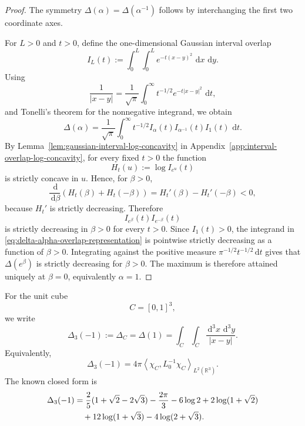 \documentclass[11pt]{article}
\newcommand{\R}{\mathbb{R}}
\newcommand{\dd}{\,\mathrm{d}}
\newcommand{\braket}[2]{\left\langle #1,#2\right\rangle}
\begin{document}
\begin{proof}
The symmetry \(\Delta(\alpha)=\Delta(\alpha^{-1})\) follows by interchanging
the first two coordinate axes.

For \(L>0\) and \(t>0\), define the one-dimensional Gaussian interval
overlap
\begin{equation}
    I_L(t):=\int_0^L\int_0^L e^{-t(x-y)^2}\,\dd x\,\dd y.
    \label{eq:interval-overlap-main}
\end{equation}
Using
\[
    \frac{1}{|x-y|}
    =
    \frac{1}{\sqrt\pi}
    \int_0^\infty t^{-1/2}e^{-t|x-y|^2}\,\dd t,
\]
and Tonelli's theorem for the nonnegative integrand, we obtain
\begin{equation}
    \Delta(\alpha)
    =
    \frac{1}{\sqrt\pi}
    \int_0^\infty
    t^{-1/2}
    I_\alpha(t)I_{\alpha^{-1}}(t)I_1(t)\,\dd t.
    \label{eq:delta-alpha-overlap-representation}
\end{equation}
By Lemma~\ref{lem:gaussian-interval-log-concavity} in
Appendix~\ref{app:interval-overlap-log-concavity}, for every fixed \(t>0\)
the function
\[
    H_t(u):=\log I_{e^u}(t)
\]
is strictly concave in \(u\).  Hence, for \(\beta>0\),
\[
    \frac{\dd}{\dd\beta}
    \left(H_t(\beta)+H_t(-\beta)\right)
    =
    H_t'(\beta)-H_t'(-\beta)<0,
\]
because \(H_t'\) is strictly decreasing.  Therefore
\[
    I_{e^\beta}(t)I_{e^{-\beta}}(t)
\]
is strictly decreasing in \(\beta>0\) for every \(t>0\).  Since
\(I_1(t)>0\), the integrand in
\eqref{eq:delta-alpha-overlap-representation} is pointwise strictly
decreasing as a function of \(\beta>0\).  Integrating against the positive
measure \(\pi^{-1/2}t^{-1/2}\dd t\) gives that
\(\Delta(e^\beta)\) is strictly decreasing for \(\beta>0\).  The maximum is
therefore attained uniquely at \(\beta=0\), equivalently \(\alpha=1\).
\end{proof}

For the unit cube
\[
    C=[0,1]^3,
\]
we write
\begin{equation}
    \Delta_3(-1):=\Delta_C=\Delta(1)
    =
    \int_C\int_C\frac{\dd^3x\,\dd^3y}{|x-y|}.
    \label{eq:delta3-definition}
\end{equation}
Equivalently,
\begin{equation}
    \Delta_3(-1)
    =
    4\pi
    \braket{\chi_C}{L_0^{-1}\chi_C}_{L^2(\R^3)}.
    \label{eq:delta3-green}
\end{equation}
The known closed form is
\begin{align}
\Delta_3(-1)
&=
\frac{2}{5}(1+\sqrt2-2\sqrt3)-\frac{2\pi}{3}
-6\log2+2\log(1+\sqrt2)
\notag\\
&\quad
+12\log(1+\sqrt3)-4\log(2+\sqrt3).
\label{eq:delta3-closed-form}
\end{align}
\end{document}
